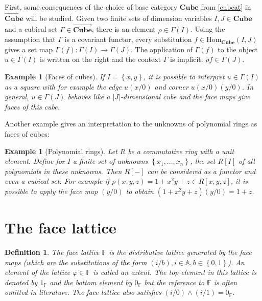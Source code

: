 \documentclass[12pt,a4paper,twoside,xetex]{book} %
\newcommand{\keyword}[1]{\emph{#1}\index{#1}}
\newtheorem{definition}[theorem]{Definition}
\newtheorem{example}[theorem]{Example}
\newcommand{\psh}[1]{\overrightarrow{#1}}
\newcommand{\homo}[3]{\text{Hom}_{#1}\left(#2,#3\right)}
\newcommand{\cube}[0]{\textbf{Cube}}
\begin{document}
First, some consequences of the choice of base category $\cube$ from \cref{cubcat} in $\psh{\cube}$ will be studied. Given two finite sets of dimension variables $I,J \in \cube$ and a cubical set $\Gamma \in \psh{\cube}$,
there is an element $\rho \in \Gamma (I)$. Using the assumption that $\Gamma$ 
is a covariant functor, every substitution $f \in \homo{\cube}{I}{J}$ 
gives a set map $\Gamma (f) : \Gamma (I) \rightarrow \Gamma (J)$. 
The application of $\Gamma(f)$ to the object $u \in \Gamma (I)$ is written on 
the right and the context $\Gamma$ is implicit: $\rho f \in \Gamma(J)$. 

\begin{example}[Faces of cubes]
If $I = \left\{x,y \right\}$, it is possible to interpret $u \in \Gamma(I)$ as 
a square with for example the edge $u(x/0)$ and corner $u(x/0)(y/0)$. In 
general, $u\in \Gamma (J)$ behaves like a $|J|$-dimensional cube and the face 
maps give faces of this cube.
\end{example}

Another example gives an interpretation to the unknowns of polynomial rings as faces of cubes:

\begin{example}[Polynomial rings]
Let $R$ be a commutative ring with a unit element. Define for $I$ a finite set 
of unknowns $\left\{x_1 , ..., x_n \right\}$, the set $R[I]$ of all polynomials 
in these unknowns. Then $R[-]$ can be considered as a functor and even a 
cubical set. For example if $p(x,y,z) = 1 + x^2y +z \in R[x,y,z]$, it is 
possible to apply the face map $(y/0)$ to obtain $(1+x^2 y +z ) (y/0) = 1+z$.
\end{example}

\section{The face lattice}

\begin{definition}\label{facelattice}
The \keyword{face lattice} $\mathbb{F}$ is the distributive lattice generated 
by the face maps (which are the substitutions of the form $(i/b), i\in 
\mathbb{A}, b \in \left\{ 0,1 \right\}$). An element of the lattice $\varphi 
\in \mathbb{F}$ is called an \keyword{extent}. The top element in this lattice 
is denoted by $1_{\mathbb{F}}$ and the bottom element by $0_{\mathbb{F}}$ but 
the reference to $\mathbb{F}$ is often omitted in literature. The face lattice 
also satisfies $(i/0) \wedge (i/1) = 0_{\mathbb{F}}$. 
\end{definition}
\end{document}
